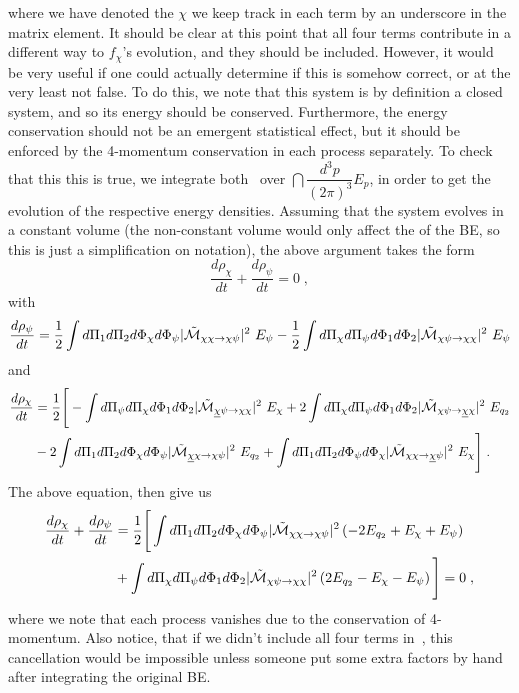 \documentclass[11pt,a4paper]{article}
\begin{document}
%
where we have denoted the $\chi$ we keep track in each term by an underscore in the matrix element. It should be clear at this point that all four terms contribute in a different way to $f_\chi$'s evolution, and they should be included. However, it would be very useful if one could actually determine if this is somehow correct, or at the very least not false.
%
To do this, we note that this system is by definition a closed system, and so its energy should be conserved. Furthermore, the energy conservation should not be  an emergent statistical effect, but it should be enforced by the 4-momentum conservation in each process separately. To check that this this is true, we integrate both~ over 
$\dint \dfrac{d^3 p}{ (2\pi)^3} E_p$, in order to get the evolution of the respective energy densities. Assuming that the system evolves in a constant volume (the non-constant volume would only affect the \rhs of the BE, so this is just a simplification on notation), the above argument takes the form
%
$$
\dfrac{d\rho_\chi}{dt} + \dfrac{d\rho_\psi}{dt} = 0 \;, 
$$
%
with
%
\begin{equation}
\dfrac{d\rho_\psi}{dt} = 
\dfrac{1}{2} \displaystyle \int d\Pi_{1}d\Pi_{2} d\Phi_{\chi} d\Phi_{\psi} |\tilde{ \mathcal{M} }_{\chi\chi \to \chi \psi}|^2 \ E_{\psi}  
-\dfrac{1}{2} \displaystyle \int  d\Pi_{\chi} d\Pi_{\psi} d\Phi_{1}d\Phi_{2}|\tilde{ \mathcal{M} }_{\chi \psi \to \chi\chi}|^2 \ E_{\psi}  
\label{eq:rho_phi_22}
\end{equation}
%
and 
%
\begin{eqnarray}
\dfrac{d\rho_\chi}{dt} &= \dfrac{1}{2} \Bigg[ 
	-\displaystyle \int d\Pi_{\psi} d\Pi_{\chi}  d\Phi_{1} d\Phi_{2}   |\tilde{ \mathcal{M} }_{\underline{\chi} \psi \to \chi \chi }|^2 \ E_{\chi}
	+ 2\displaystyle \int d\Pi_{\chi} d\Pi_{\psi} d\Phi_{1}d\Phi_{2}  |\tilde{ \mathcal{M} }_{\chi \psi  \to \underline{\chi} \chi}|^2 \ E_{q_2} 
	\nonumber \\
	&- 2\displaystyle \int d\Pi_{1}d\Pi_{2} d\Phi_{\chi} d\Phi_{\psi}   |\tilde{ \mathcal{M} }_{\underline{\chi} \chi \to \chi \psi }|^2 \ E_{q_2}
	+ \displaystyle \int  d\Pi_{1} d\Pi_{2} d\Phi_{\psi} d\Phi_{\chi}  |\tilde{ \mathcal{M} }_{\chi \chi  \to \underline{\chi} \psi}|^2 \ E_{\chi}
 \Bigg] \;.
\label{eq:rho_chi_22}
\end{eqnarray}
%
The above equation, then give us 
%
\begin{eqnarray}
\dfrac{d\rho_\chi}{dt} + \dfrac{d\rho_\psi}{dt} &=   \dfrac{1}{2} \Bigg[ 
\displaystyle \int d\Pi_{1}d\Pi_{2} d\Phi_{\chi} d\Phi_{\psi} |\tilde{ \mathcal{M} }_{\chi\chi \to \chi \psi}|^2 \left(  -2 E_{q_2} + E_\chi + E_\psi  \right) \\
&+
\displaystyle \int d\Pi_{\chi} d\Pi_{\psi} d\Phi_{1}d\Phi_{2} |\tilde{ \mathcal{M} }_{\chi \psi  \to \chi \chi}|^2 \left( 2 E_{q_2} -E_\chi -E_\psi   \right) 
 \Bigg] = 0 \;,
\end{eqnarray}
%
where we note that each process vanishes due to the conservation of 4-momentum. Also notice, that if we didn't include all four terms in~, this cancellation would be impossible unless someone put some extra factors by hand after integrating the original BE.
\end{document}
